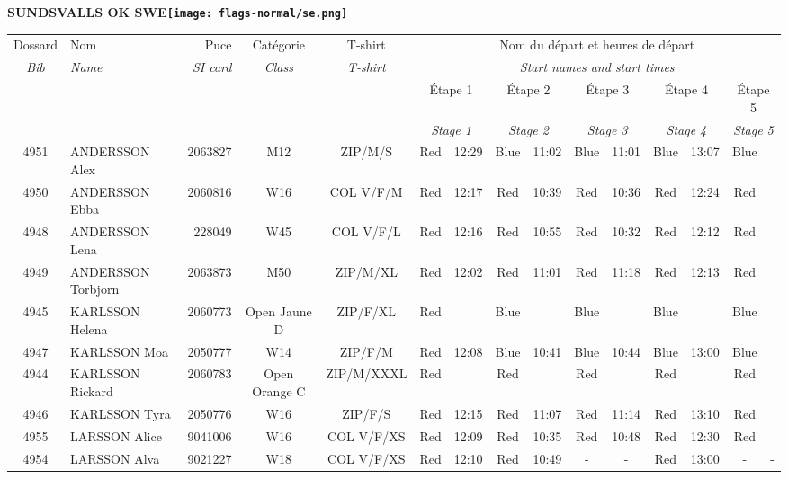 \documentclass{report}
\begin{document}
\newpage
  \Huge \centering \bfseries SUNDSVALLS OK  SWE\normalfont \footnotesize \sffamily \hfill \texttt{[image: flags-normal/se.png]} \newline 
  \begin{longtable}{|c|l|r|c|c|*{5}{cc|}}
    Dossard & Nom  & Puce    & Catégorie & T-shirt & \multicolumn{10}{c|}{Nom du départ et heures de départ} \\
    \itshape Bib     & \itshape Name & \itshape SI card & \itshape Class  & \itshape  T-shirt  & \multicolumn{10}{c|}{\itshape Start names and start times} \\
    \hline
    & & & & & \multicolumn{2}{c|}{Étape 1} & \multicolumn{2}{c|}{Étape 2} & \multicolumn{2}{c|}{Étape 3} & \multicolumn{2}{c|}{Étape 4} & \multicolumn{2}{c|}{Étape 5} \\
    & & & & & \multicolumn{2}{c|}{\itshape Stage 1} & \multicolumn{2}{c|}{\itshape Stage 2} & \multicolumn{2}{c|}{\itshape Stage 3} & \multicolumn{2}{c|}{\itshape Stage 4} & \multicolumn{2}{c|}{\itshape Stage 5} \\
    \hline
    4951 & ANDERSSON Alex & 2063827 & M12 & ZIP/M/S & Red & 12:29 & Blue & 11:02 & Blue & 11:01 & Blue & 13:07 & Blue &  \\
    4950 & ANDERSSON Ebba & 2060816 & W16 & COL V/F/M & Red & 12:17 & Red & 10:39 & Red & 10:36 & Red & 12:24 & Red &  \\
    4948 & ANDERSSON Lena & 228049 & W45 & COL V/F/L & Red & 12:16 & Red & 10:55 & Red & 10:32 & Red & 12:12 & Red &  \\
    4949 & ANDERSSON Torbjorn & 2063873 & M50 & ZIP/M/XL & Red & 12:02 & Red & 11:01 & Red & 11:18 & Red & 12:13 & Red &  \\
    4945 & KARLSSON Helena & 2060773 & Open Jaune D & ZIP/F/XL & Red &   & Blue &   & Blue &   & Blue &   & Blue &  \\
    4947 & KARLSSON Moa & 2050777 & W14 & ZIP/F/M & Red & 12:08 & Blue & 10:41 & Blue & 10:44 & Blue & 13:00 & Blue &  \\
    4944 & KARLSSON Rickard & 2060783 & Open Orange C & ZIP/M/XXXL & Red &   & Red &   & Red &   & Red &   & Red &  \\
    4946 & KARLSSON Tyra & 2050776 & W16 & ZIP/F/S & Red & 12:15 & Red & 11:07 & Red & 11:14 & Red & 13:10 & Red &  \\
    4955 & LARSSON Alice & 9041006 & W16 & COL V/F/XS & Red & 12:09 & Red & 10:35 & Red & 10:48 & Red & 12:30 & Red &  \\
    4954 & LARSSON Alva & 9021227 & W18 & COL V/F/XS & Red & 12:10 & Red & 10:49 & - &  - & Red & 13:00 & - &  -\\

\end{longtable}
\end{document}
